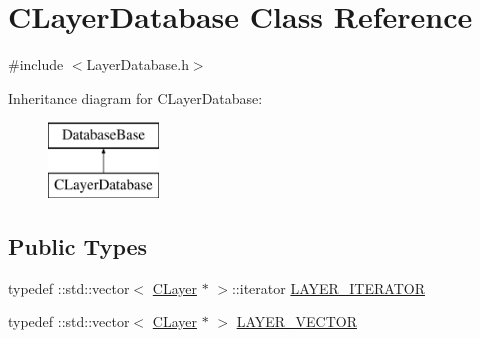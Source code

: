 \hypertarget{class_c_layer_database}{}\section{C\+Layer\+Database Class Reference}
\label{class_c_layer_database}


{\ttfamily \#include $<$Layer\+Database.\+h$>$}

Inheritance diagram for C\+Layer\+Database\+:\begin{figure}[H]
\begin{center}
\leavevmode
\includegraphics[height=2.000000cm]{class_c_layer_database}
\end{center}
\end{figure}
\subsection*{Public Types}
\begin{DoxyCompactItemize}
\item 
typedef \+::std\+::vector$<$ \hyperlink{class_c_layer}{C\+Layer} $\ast$ $>$\+::iterator \hyperlink{class_c_layer_database_ac65015c09e6f4003add9d266f9c52b69}{L\+A\+Y\+E\+R\+\_\+\+I\+T\+E\+R\+A\+T\+O\+R}
\item 
typedef \+::std\+::vector$<$ \hyperlink{class_c_layer}{C\+Layer} $\ast$ $>$ \hyperlink{class_c_layer_database_a744d054c8d962f3ba71d30d7ba0f3811}{L\+A\+Y\+E\+R\+\_\+\+V\+E\+C\+T\+O\+R}
\end{DoxyCompactItemize}
